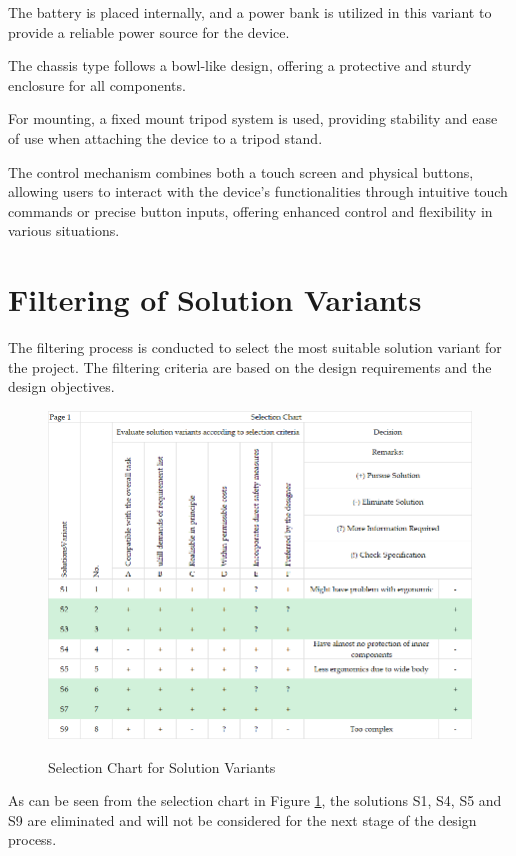 The battery is placed internally, and a power bank is utilized in this variant to provide a reliable power source for the device.

The chassis type follows a bowl-like design, offering a protective and sturdy enclosure for all components.

For mounting, a fixed mount tripod system is used, providing stability and ease of use when attaching the device to a tripod stand.

The control mechanism combines both a touch screen and physical buttons, allowing users to interact with the device's functionalities through intuitive touch commands or precise button inputs, offering enhanced control and flexibility in various situations.

\section{Filtering of Solution Variants}

The filtering process is conducted to select the most suitable solution variant for the project. The filtering criteria are based on the design requirements and the design objectives.

\begin{figure}[ht!]
    \centering
    {\includegraphics[width=\linewidth]{texs/Part1/chapter3/image/selchart2.png}}
    \caption{Selection Chart for Solution Variants}
    \label{fig:selection-chart-solution-variants}
\end{figure}

As can be seen from the selection chart in Figure \ref{fig:selection-chart-solution-variants}, the solutions S1, S4, S5 and S9 are eliminated and will not be considered for the next stage of the design process.

